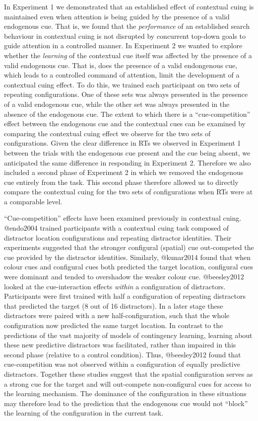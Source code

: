\documentclass[
  man,
  floatsintext,
  longtable,
  nolmodern,
  notxfonts,
  notimes,
  colorlinks=true,linkcolor=blue,citecolor=blue,urlcolor=blue]{apa7}
\begin{document}
In Experiment 1 we demonstrated that an established effect of contextual
cuing is maintained even when attention is being guided by the presence
of a valid endogenous cue. That is, we found that the \emph{performance}
of an established search behaviour in contextual cuing is not disrupted
by concurrent top-down goals to guide attention in a controlled manner.
In Experiment 2 we wanted to explore whether the \emph{learning} of the
contextual cue itself was affected by the presence of a valid endogenous
cue. That is, does the presence of a valid endongenous cue, which leads
to a controlled command of attention, limit the development of a
contextual cuing effect. To do this, we trained each participant on two
sets of repeating configurations. One of these sets was always presented
in the presence of a valid endogenous cue, while the other set was
always presented in the absence of the endogenous cue. The extent to
which there is a ``cue-competition'' effect between the endogenous cue
and the contextual cues can be examined by comparing the contextual
cuing effect we observe for the two sets of configurations. Given the
clear difference in RTs we observed in Experiment 1 between the trials
with the endogenous cue present and the cue being absent, we anticipated
the same difference in responding in Experiment 2. Therefore we also
included a second phase of Experiment 2 in which we removed the
endogenous cue entirely from the task. This second phase therefore
allowed us to directly compare the contextual cuing for the two sets of
configurations when RTs were at a comparable level.

``Cue-competition'' effects have been examined previously in contextual
cuing. @endo2004 trained participants with a contextual cuing task
composed of distractor location configurations and repeating distractor
identities. Their experiments suggested that the stronger configural
(spatial) cue out-competed the cue provided by the distractor
identities. Similarly, @kunar2014 found that when colour cues and
configural cues both predicted the target location, configural cues were
dominant and tended to overshadow the weaker colour cue. @beesley2012
looked at the cue-interaction effects \emph{within} a configuration of
distractors. Participants were first trained with half a configuration
of repeating distractors that predicted the target (8 out of 16
distractors). In a later stage these distractors were paired with a new
half-configuration, such that the whole configuration now predicted the
same target location. In contrast to the predictions of the vast
majority of models of contingency learning, learning about these new
predictive distractors was facilitated, rather than impaired in this
second phase (relative to a control condition). Thus, @beesley2012 found
that cue-competition was not observed within a configuration of equally
predictive distractors. Together these studies suggest that the spatial
configuration serves as a strong cue for the target and will out-compete
non-configural cues for access to the learning mechanism. The dominance
of the configuration in these situations may therefore lead to the
prediction that the endogenous cue would not ``block'' the learning of
the configuration in the current task.
\end{document}
